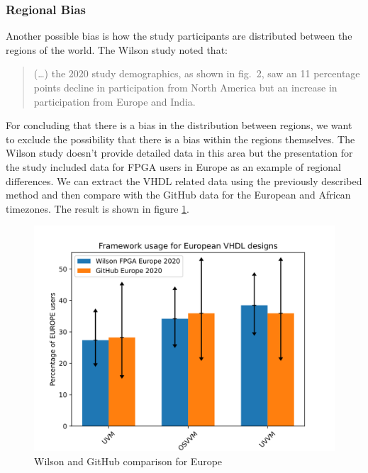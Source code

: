 \documentclass[]{article}
\begin{document}
\hypertarget{regional-bias}{%
\subsubsection{Regional Bias}\label{regional-bias}}

Another possible bias is how the study participants are distributed between the regions of the world. The Wilson study noted that:

\begin{quote}
(\ldots{}) the 2020 study demographics, as shown in fig.~2, saw an 11 percentage points decline in participation from North America but an increase in participation from Europe and India.
\end{quote}

For concluding that there is a bias in the distribution between regions, we want to exclude the possibility that there is a bias within the regions themselves. The Wilson study doesn't provide detailed data in this area but the presentation for the study included data for FPGA users in Europe as an example of regional differences. We can extract the VHDL related data using the previously described method and then compare with the GitHub data for the European and African timezones. The result is shown in figure \ref{fig:github-wilson-europe}.

\begin{figure}

{\centering \includegraphics[width=1\linewidth]{img/github_wilson_europe} 

}

\caption{Wilson and GitHub comparison for Europe}\label{fig:github-wilson-europe}
\end{figure}
\end{document}
